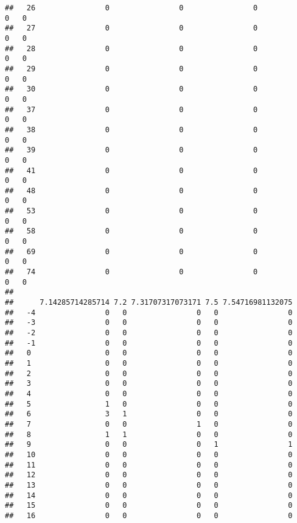 \documentclass[]{article}
\begin{document}
\begin{verbatim}
##   26                0                0                0                0   0
##   27                0                0                0                0   0
##   28                0                0                0                0   0
##   29                0                0                0                0   0
##   30                0                0                0                0   0
##   37                0                0                0                0   0
##   38                0                0                0                0   0
##   39                0                0                0                0   0
##   41                0                0                0                0   0
##   48                0                0                0                0   0
##   53                0                0                0                0   0
##   58                0                0                0                0   0
##   69                0                0                0                0   0
##   74                0                0                0                0   0
##     
##      7.14285714285714 7.2 7.31707317073171 7.5 7.54716981132075
##   -4                0   0                0   0                0
##   -3                0   0                0   0                0
##   -2                0   0                0   0                0
##   -1                0   0                0   0                0
##   0                 0   0                0   0                0
##   1                 0   0                0   0                0
##   2                 0   0                0   0                0
##   3                 0   0                0   0                0
##   4                 0   0                0   0                0
##   5                 1   0                0   0                0
##   6                 3   1                0   0                0
##   7                 0   0                1   0                0
##   8                 1   1                0   0                0
##   9                 0   0                0   1                1
##   10                0   0                0   0                0
##   11                0   0                0   0                0
##   12                0   0                0   0                0
##   13                0   0                0   0                0
##   14                0   0                0   0                0
##   15                0   0                0   0                0
##   16                0   0                0   0                0

\end{verbatim}
\end{document}
